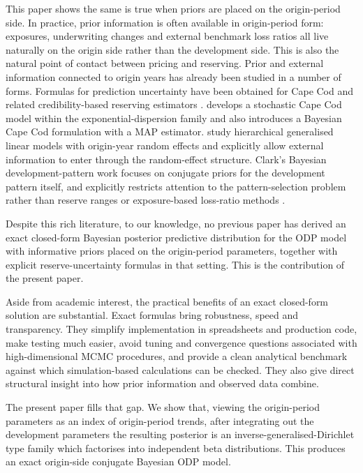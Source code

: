 \documentclass[11pt]{article}
\newcommand{\1}{\mathbf{1}}
\begin{document}
This paper shows the same is true when priors are placed on the origin-period side. In practice, prior information is often available in origin-period form: exposures, underwriting changes and external benchmark loss ratios all live naturally on the origin side rather than the development side. 
This is also the natural point of contact between pricing and reserving. Prior and external information connected to origin years has already been studied in a number of forms. 
Formulas for prediction uncertainty have been obtained for Cape Cod \citep{Saluz2015CapeCod} and related credibility-based reserving estimators \citep{Mack2008BF,SaluzGislerWuthrich2011}. 
\citet{Taylor2019CapeCod} develops a stochastic Cape Cod model within the exponential-dispersion family and also introduces a Bayesian Cape Cod formulation with a MAP estimator. 
\citet{GigantePicechSigalotti2013} study hierarchical generalised linear models with origin-year random effects and explicitly allow external information to enter through the random-effect structure. 
Clark's Bayesian development-pattern work focuses on conjugate priors for the development pattern itself, and explicitly restricts attention to the pattern-selection problem rather than reserve ranges or exposure-based loss-ratio methods \citep{Clark2016BayesianDevelopment}.

Despite this rich literature, to our knowledge, no previous paper has derived an exact closed-form Bayesian posterior predictive distribution for the 
ODP model with informative priors placed on the origin-period parameters, together with explicit reserve-uncertainty formulas in that setting. 
This is the contribution of the present paper. 

Aside from academic interest, the practical benefits of an exact closed-form solution are substantial. Exact formulas bring robustness, speed and transparency. 
They simplify implementation in spreadsheets and production code, make testing much easier, avoid tuning and convergence questions associated with high-dimensional MCMC procedures, and provide a clean analytical benchmark against which 
simulation-based calculations can be checked. They also give direct structural insight into how prior information and observed data combine. 

The present paper fills that gap. We show that, viewing the origin-period parameters as an index of origin-period trends, after integrating out the development parameters the resulting posterior is an inverse-generalised-Dirichlet type family which 
factorises into independent beta distributions. This produces an exact origin-side conjugate Bayesian ODP model.
\end{document}
